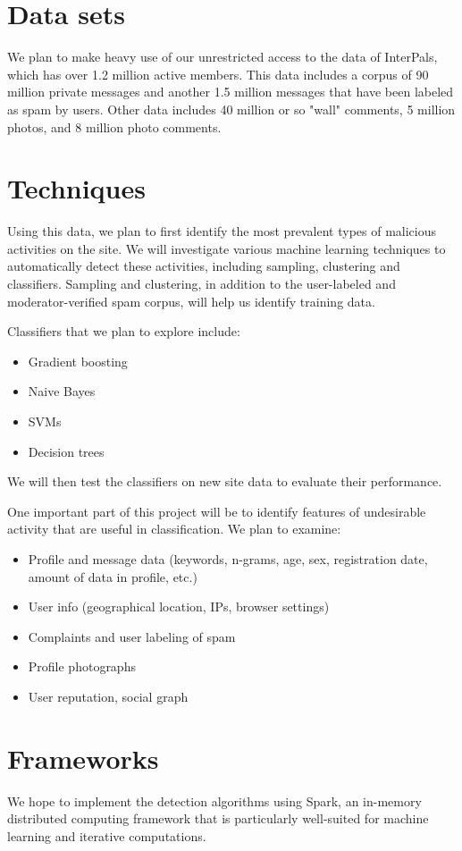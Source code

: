 \documentclass[preprint]{acm_proc_article-sp}
\begin{document}
\section{Data sets}

We plan to make heavy use of our unrestricted access to the data of
InterPals, which has over 1.2 million active members. This data
includes a corpus of 90 million private messages and another 1.5
million messages that have been labeled as spam by users. Other data
includes 40 million or so "wall" comments, 5 million photos, and 8
million photo comments. 

\section{Techniques}

Using this data, we plan to first identify the most prevalent types of 
malicious activities on the site. We will investigate various machine learning 
techniques to automatically detect these activities, including sampling, clustering and 
classifiers. Sampling and clustering, in addition to the user-labeled and moderator-verified 
spam corpus, will help us identify training data. 

Classifiers that we plan to explore 
include: 

\begin{itemize}
\item Gradient boosting
\item Naive Bayes
\item SVMs 
\item Decision trees
\end{itemize}

We will then test the classifiers on new site data to evaluate their performance.

One important part of this project will be to identify features of undesirable activity that are useful in classification. We plan to examine:
\begin{itemize}
\item Profile and message data (keywords, n-grams, age, sex, registration date, amount of data in profile, etc.)
\item User info (geographical location, IPs, browser settings)
\item Complaints and user labeling of spam
\item Profile photographs
\item User reputation, social graph
\end{itemize}

\section{Frameworks}
We hope to implement the detection algorithms using Spark, an
in-memory distributed computing framework that is particularly
well-suited for machine learning and iterative computations.

\balancecolumns
\end{document}
